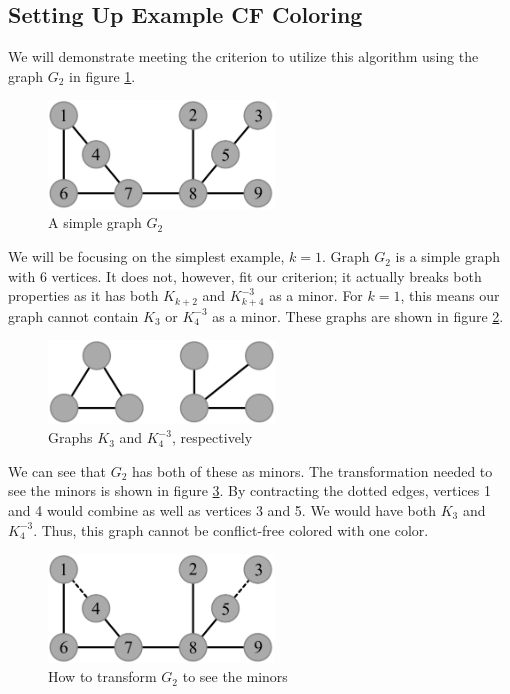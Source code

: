 \documentclass{sig-alternate}
\begin{document}
\subsection{Setting Up Example CF Coloring}
We will demonstrate meeting the criterion to utilize this algorithm using the graph $G_2$ in figure \ref{fig:criterion}.

\begin{figure}[h]
	\centering
	\includegraphics[width=6cm]{../figures/criterion.pdf}
	\caption{A simple graph $G_2$}\label{fig:criterion}
\end{figure}

We will be focusing on the simplest example, $k = 1$. Graph $G_2$ is a simple graph with 6 vertices. It does not, however, fit our criterion; it actually breaks both properties as it has both $K_{k+2}$ and $K_{k+4}^{-3}$ as a minor. For $k = 1$, this means our graph cannot contain $K_{3}$ or $K_{4}^{-3}$ as a minor. These graphs are shown in figure \ref{fig:bad-criterion}.

\begin{figure}[h]
	\centering
	\includegraphics[width=6cm]{../figures/bad-criterion.pdf}
	\caption{Graphs $K_{3}$ and $K_{4}^{-3}$, respectively}\label{fig:bad-criterion}
\end{figure}

We can see that $G_2$ has both of these as minors. The transformation needed to see the minors is shown in figure \ref{fig:criterion-minor}. By contracting the dotted edges, vertices 1 and 4 would combine as well as vertices 3 and 5. We would have both $K_{3}$ and $K_{4}^{-3}$. Thus, this graph cannot be conflict-free colored with one color.

\begin{figure}[h]
	\centering
	\includegraphics[width=6cm]{../figures/criterion-minor.pdf}
	\caption{How to transform $G_2$ to see the minors}\label{fig:criterion-minor}
\end{figure}
\end{document}
